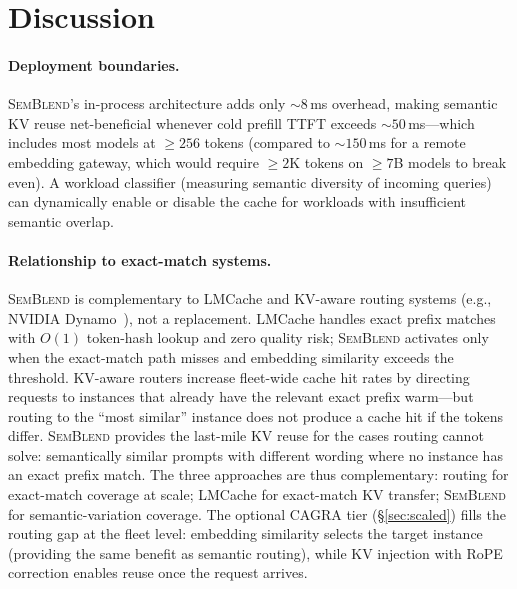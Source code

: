\documentclass[10pt,twocolumn]{article}
\newcommand{\semblend}{\textsc{SemBlend}\xspace}
\begin{document}
\section{Discussion}
\label{sec:discussion}

\paragraph{Deployment boundaries.}
\semblend's in-process architecture adds only ${\sim}8$\,ms overhead,
making semantic KV reuse net-beneficial whenever cold prefill TTFT exceeds
${\sim}50$\,ms---which includes most models at ${\geq}256$ tokens
(compared to ${\sim}150$\,ms for a remote embedding gateway, which
would require ${\geq}2$K tokens on ${\geq}7$B models to break even).
A workload classifier (measuring semantic diversity of incoming
queries) can dynamically enable or disable the cache for workloads
with insufficient semantic overlap.

\paragraph{Relationship to exact-match systems.}
\semblend is complementary to LMCache and KV-aware routing systems
(e.g., NVIDIA Dynamo~\cite{dynamo}), not a replacement. LMCache handles
exact prefix matches with $O(1)$ token-hash lookup and zero quality risk;
\semblend activates only when the exact-match path misses and embedding
similarity exceeds the threshold. KV-aware routers increase fleet-wide
cache hit rates by directing requests to instances that already have
the relevant exact prefix warm---but routing to the ``most similar''
instance does not produce a cache hit if the tokens differ. \semblend
provides the last-mile KV reuse for the cases routing cannot solve:
semantically similar prompts with different wording where no instance
has an exact prefix match. The three approaches are thus complementary:
routing for exact-match coverage at scale; LMCache for exact-match KV
transfer; \semblend for semantic-variation coverage. The optional CAGRA tier
(\S\ref{sec:scaled}) fills the routing gap at the fleet level: embedding
similarity selects the target instance (providing the same benefit as
semantic routing), while KV injection with RoPE correction enables reuse
once the request arrives.
\end{document}
